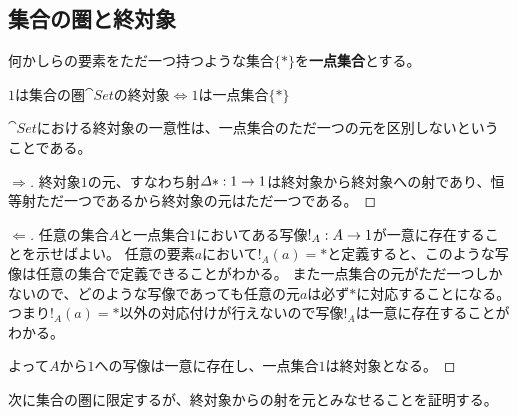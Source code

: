 \subsection{集合の圏と終対象}\label{chap-5.2-sets-and-terminal-object}
	\begin{define}[一点集合]\label{def-unit-set}
		何かしらの要素をただ一つ持つような集合$\{*\}$を\textbf{一点集合}とする。
	\end{define}
	\begin{prop}[一点集合と終対象の同値性]\label{prop-equivalence-unit-set-and-terminal-object}
		$1$は集合の圏$\cat{Set}$の終対象$\iff 1$は一点集合$\{*\}$
	\end{prop}
  $\cat{Set}$における終対象の一意性は、一点集合のただ一つの元を区別しないということである。
	\begin{proof}[$\Longrightarrow$]
		終対象$1$の元、すなわち射$\varDelta *:1\rightarrow 1$は終対象から終対象への射であり、恒等射ただ一つであるから終対象の元はただ一つである。
	\end{proof}
	\begin{proof}[$\Longleftarrow$]
		任意の集合$A$と一点集合$1$においてある写像$!_A:A\rightarrow 1$が一意に存在することを示せばよい。
		任意の要素$a$において$!_A(a)=*$と定義すると、このような写像は任意の集合で定義できることがわかる。
		また一点集合の元がただ一つしかないので、どのような写像であっても任意の元$a$は必ず$*$に対応することになる。つまり$!_A(a)=*$以外の対応付けが行えないので写像$!_A$は一意に存在することがわかる。

		よって$A$から$1$への写像は一意に存在し、一点集合$1$は終対象となる。
	\end{proof}
	次に集合の圏に限定するが、終対象からの射を元とみなせることを証明する。

